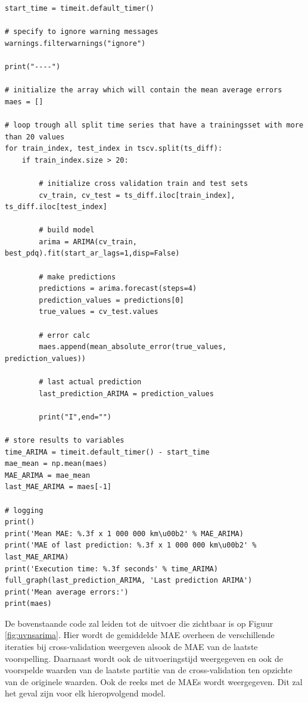 \begin{verbatim}
start_time = timeit.default_timer()

# specify to ignore warning messages
warnings.filterwarnings("ignore") 

print("----")

# initialize the array which will contain the mean average errors
maes = []

# loop trough all split time series that have a trainingsset with more than 20 values
for train_index, test_index in tscv.split(ts_diff):
    if train_index.size > 20:
    
        # initialize cross validation train and test sets
        cv_train, cv_test = ts_diff.iloc[train_index], ts_diff.iloc[test_index]
        
        # build model
        arima = ARIMA(cv_train, best_pdq).fit(start_ar_lags=1,disp=False)
        
        # make predictions
        predictions = arima.forecast(steps=4)
        prediction_values = predictions[0]
        true_values = cv_test.values
        
        # error calc
        maes.append(mean_absolute_error(true_values, prediction_values))
        
        # last actual prediction 
        last_prediction_ARIMA = prediction_values
        
        print("I",end="")

# store results to variables
time_ARIMA = timeit.default_timer() - start_time
mae_mean = np.mean(maes)
MAE_ARIMA = mae_mean
last_MAE_ARIMA = maes[-1]

# logging
print()
print('Mean MAE: %.3f x 1 000 000 km\u00b2' % MAE_ARIMA)
print('MAE of last prediction: %.3f x 1 000 000 km\u00b2' % last_MAE_ARIMA)
print('Execution time: %.3f seconds' % time_ARIMA)
full_graph(last_prediction_ARIMA, 'Last prediction ARIMA')
print('Mean average errors:')
print(maes)
\end{verbatim}

De bovenstaande code zal leiden tot de uitvoer die zichtbaar is op Figuur \ref{fig:uvnsarima}. Hier wordt de gemiddelde MAE overheen de verschillende iteraties bij cross-validation weergeven alsook de MAE van de laatste voorspelling. Daarnaast wordt ook de uitvoeringstijd weergegeven en ook de voorspelde waarden van de laatste partitie van de cross-validation ten opzichte van de originele waarden. Ook de reeks met de MAEs wordt weergegeven. Dit zal het geval zijn voor elk hieropvolgend model.

